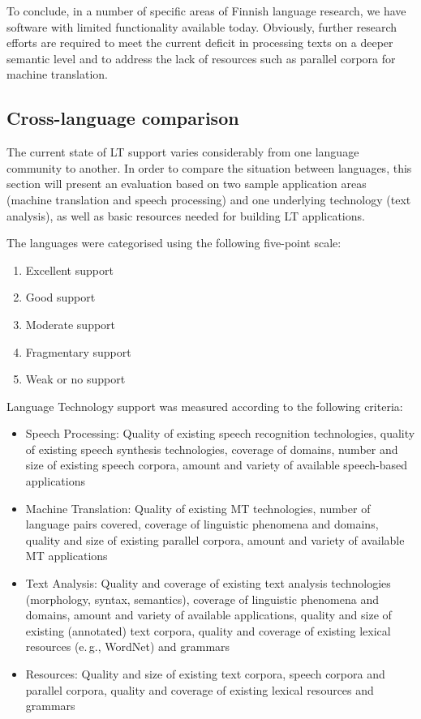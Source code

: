 \begin{multicols}{2}
To conclude, in a number of specific areas of Finnish language research, we
have software with limited functionality available today. Obviously, further
research efforts are required to meet the current deficit in processing texts
on a deeper semantic level and to address the lack of resources such as
parallel corpora for machine translation.

\subsection{Cross-language comparison}

The current state of LT support varies considerably from one language
community to another. In order to compare the situation between
languages, this section will present an evaluation based on two sample
application areas (machine translation and speech processing) and one
underlying technology (text analysis), as well as basic resources
needed for building LT applications.

The languages were categorised using the following five-point scale: 

\begin{enumerate}
\item Excellent support
\item Good support
\item Moderate support
\item Fragmentary support
\item Weak or no support
\end{enumerate}

Language Technology support was measured according to the following criteria:

\begin{itemize}
\item Speech Processing: Quality of existing speech recognition
       technologies, quality of existing speech synthesis
       technologies, coverage of domains, number and size of existing
       speech corpora, amount and variety of available speech-based
       applications 

     \item Machine Translation: Quality of existing MT technologies, number
       of language pairs covered, coverage of linguistic phenomena and
       domains, quality and size of existing parallel corpora, amount
       and variety of available MT applications

\item Text Analysis: Quality and coverage of existing text analysis
       technologies (morphology, syntax, semantics), coverage of
       linguistic phenomena and domains, amount and variety of
       available applications, quality and size of existing
       (annotated) text corpora, quality and coverage of existing
       lexical resources (e.\,g., WordNet) and grammars
\item Resources: Quality and size of existing text corpora, speech
       corpora and parallel corpora, quality and coverage of existing
       lexical resources and grammars
\end{itemize}


\end{multicols}
